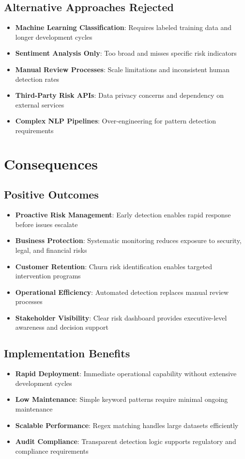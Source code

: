 \documentclass[11pt]{article}
\begin{document}
\subsection{Alternative Approaches Rejected}
\begin{itemize}
\item \textbf{Machine Learning Classification}: Requires labeled training data and longer development cycles
\item \textbf{Sentiment Analysis Only}: Too broad and misses specific risk indicators
\item \textbf{Manual Review Processes}: Scale limitations and inconsistent human detection rates
\item \textbf{Third-Party Risk APIs}: Data privacy concerns and dependency on external services
\item \textbf{Complex NLP Pipelines}: Over-engineering for pattern detection requirements
\end{itemize}

\section{Consequences}

\subsection{Positive Outcomes}
\begin{itemize}
\item \textbf{Proactive Risk Management}: Early detection enables rapid response before issues escalate
\item \textbf{Business Protection}: Systematic monitoring reduces exposure to security, legal, and financial risks
\item \textbf{Customer Retention}: Churn risk identification enables targeted intervention programs
\item \textbf{Operational Efficiency}: Automated detection replaces manual review processes
\item \textbf{Stakeholder Visibility}: Clear risk dashboard provides executive-level awareness and decision support
\end{itemize}

\subsection{Implementation Benefits}
\begin{itemize}
\item \textbf{Rapid Deployment}: Immediate operational capability without extensive development cycles
\item \textbf{Low Maintenance}: Simple keyword patterns require minimal ongoing maintenance
\item \textbf{Scalable Performance}: Regex matching handles large datasets efficiently
\item \textbf{Audit Compliance}: Transparent detection logic supports regulatory and compliance requirements
\end{itemize}
\end{document}

